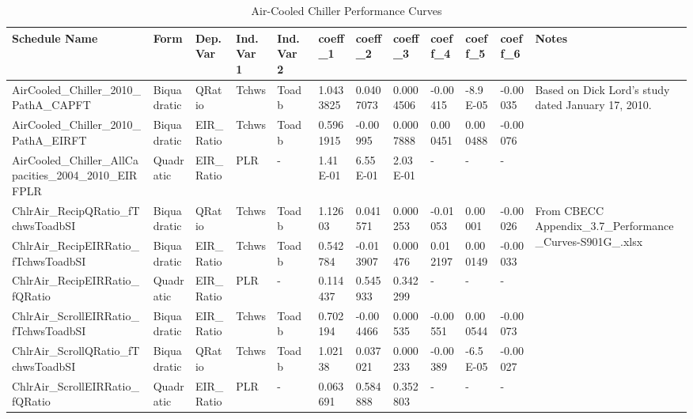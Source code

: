 \begin{table}
\scriptsize
\centering
\caption{Air-Cooled Chiller Performance Curves}
\label{tab:acc_perf_curves}
\begin{tabular}{|p{0.6in}|p{0.4in}|p{0.25in}|p{0.25in}|p{0.25in}|p{0.4in}|p{0.4in}|p{0.4in}|p{0.4in}|p{0.4in}|p{0.4in}|p{0.4in}|}
\hline
\textbf{Schedule Name} &
  \textbf{Form} &
  \textbf{Dep. Var} &
  \textbf{Ind. Var 1} &
  \textbf{Ind. Var 2} &
  \textbf{coeff\_1} &
  \textbf{coeff\_2} &
  \textbf{coeff\_3} &
  \textbf{coeff\_4} &
  \textbf{coeff\_5} &
  \textbf{coeff\_6} &
  \textbf{Notes} \\ \hline
AirCooled\_Chiller\_2010\_PathA\_CAPFT &
  Biquadratic &
  QRatio &
  Tchws &
  Toadb &
  1.0433825 &
  0.0407073 &
  0.0004506 &
  -0.00415 &
  -8.9E-05 &
  -0.00035 &
  \multirow{3}{*}{\parbox{0.4in}{Based on Dick Lord's study dated January 17, 2010.}} \\ \cline{1-11}
AirCooled\_Chiller\_2010\_PathA\_EIRFT                 & Biquadratic & EIR\_Ratio & Tchws & Toadb & 0.5961915 & -0.00995  & 0.0007888 & 0.000451 & 0.000488 & -0.00076 &  \\ \cline{1-11}
AirCooled\_Chiller\_AllCapacities\_2004\_2010\_EIRFPLR & Quadratic   & EIR\_Ratio & PLR   & -     & 1.41E-01  & 6.55E-01  & 2.03E-01  & -        & -        & -        &  \\ \hline
ChlrAir\_RecipQRatio\_fTchwsToadbSI &
  Biquadratic &
  QRatio &
  Tchws &
  Toadb &
  1.12603 &
  0.041571 &
  0.000253 &
  -0.01053 &
  0.00001 &
  -0.00026 &
  \multirow{6}{*}{\parbox{0.4in}{From CBECC Appendix\_3.7\_Performance\_Curves-S901G\_.xlsx}} \\ \cline{1-11}
ChlrAir\_RecipEIRRatio\_fTchwsToadbSI                    & Biquadratic & EIR\_Ratio & Tchws & Toadb & 0.542784  & -0.013907 & 0.000476  & 0.012197 & 0.000149 & -0.00033 &  \\ \cline{1-11}
ChlrAir\_RecipEIRRatio\_fQRatio                          & Quadratic   & EIR\_Ratio & PLR   & -     & 0.114437  & 0.545933  & 0.342299  & -        & -        & -        &  \\ \cline{1-11}
ChlrAir\_ScrollEIRRatio\_fTchwsToadbSI                   & Biquadratic & EIR\_Ratio & Tchws & Toadb & 0.702194  & -0.004466 & 0.000535  & -0.00551 & 0.000544 & -0.00073 &  \\ \cline{1-11}
ChlrAir\_ScrollQRatio\_fTchwsToadbSI                     & Biquadratic & QRatio   & Tchws & Toadb & 1.02138   & 0.037021  & 0.000233  & -0.00389 & -6.5E-05 & -0.00027 &  \\ \cline{1-11}
ChlrAir\_ScrollEIRRatio\_fQRatio                         & Quadratic   & EIR\_Ratio & PLR   & -     & 0.063691  & 0.584888  & 0.352803  & -        & -        & -        &  \\ \hline
\end{tabular}
\end{table}